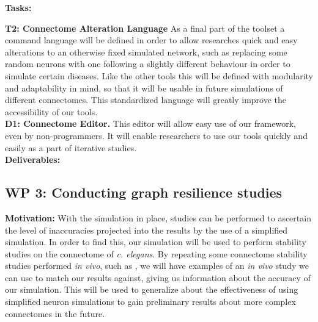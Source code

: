 \documentclass[a4paper,11pt]{article}
\begin{document}
\textbf{Tasks:} 


\textbf{T2: Connectome Alteration Language}
As a final part of the toolset a command language will be defined in order to allow researches quick and easy alterations to an otherwise fixed simulated network, such as replacing some random neurons with one following a slightly different behaviour in order to simulate certain diseases. Like the other tools this will be defined with modularity and adaptability in mind, so that it will be usable in future simulations of different connectomes. This standardized language will greatly improve the accessibility of our tools.
\\[0,2cm]

\textbf{D1: Connectome Editor.} This editor will allow easy use of our framework, even by non-programmers. It will enable researchers to use our tools quickly and easily as a part of iterative studies.
\\[0,2cm]


\textbf{Deliverables:} 


\subsection{WP 3: Conducting graph resilience studies}

\citep{Ip2011ResilienceTransportationNetworks}
\citep{Gaudiot1990NetworkResilience}
\citep{Kirsch2006LessHashing}
\citep{Loguinov2005Peer2PeerResilience}
\citep{Peters2013BrainFunctionalNetworks}
\citep{Samatova2008GraphPerturbationScalableAlgorithms}
\citep{Ying2008RandomizingSocialNetworks}
\citep{Peters2013BrainFunctionalNetworks}
\citep{Hendrix2010}
\citep{Sauer2004}
\citep{Newman2003}
\citep{Piraveenan2012}
\citep{Ash2007}
\citep{betzel2013multi}


\textbf{Motivation:}
With the simulation in place, studies can be performed to ascertain the level of inaccuracies projected into the results by the use of a simplified simulation. In order to find this, our simulation will be used to perform stability studies on the connectome of \emph{c. elegans}. By repeating some connectome stability studies performed \emph{in vivo}, such as \citep{Avery1989473}, we will have examples of an \emph{in vivo} study we can use to match our results against, giving us information about the accuracy of our simulation. This will be used to generalize about the effectiveness of using simplified neuron simulations to gain preliminary results about more complex connectomes in the future. 
\end{document}
